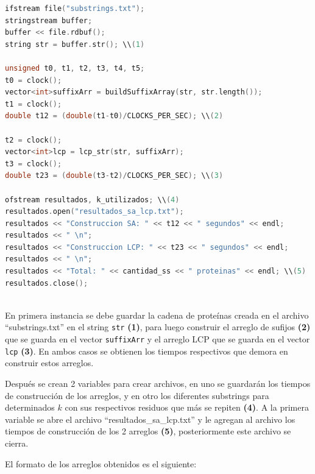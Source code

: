 \begin{lstlisting}[language=C++, caption=Obtención de los arreglos SA y LCP para la cadena de proteínas]
ifstream file("substrings.txt");
stringstream buffer;
buffer << file.rdbuf();
string str = buffer.str(); \\(1)

unsigned t0, t1, t2, t3, t4, t5;
t0 = clock();
vector<int>suffixArr = buildSuffixArray(str, str.length());
t1 = clock();
double t12 = (double(t1-t0)/CLOCKS_PER_SEC); \\(2)

t2 = clock();
vector<int>lcp = lcp_str(str, suffixArr);
t3 = clock();
double t23 = (double(t3-t2)/CLOCKS_PER_SEC); \\(3)

ofstream resultados, k_utilizados; \\(4)
resultados.open("resultados_sa_lcp.txt");
resultados << "Construccion SA: " << t12 << " segundos" << endl;
resultados << " \n";
resultados << "Construccion LCP: " << t23 << " segundos" << endl;
resultados << " \n";
resultados << "Total: " << cantidad_ss << " proteinas" << endl; \\(5)
resultados.close();
	
\end{lstlisting}

En primera instancia se debe guardar la cadena de proteínas creada en el archivo ``substrings.txt'' en el string \texttt{str} \textbf{(1)}, para luego construir el arreglo de sufijos \textbf{(2)} que se guarda en el vector \texttt{suffixArr} y el arreglo LCP que se guarda en el vector \texttt{lcp} \textbf{(3)}. En ambos casos se obtienen los tiempos respectivos que demora en construir estos arreglos.

Después se crean 2 variables para crear archivos, en uno se guardarán los tiempos de construcción de los arreglos, y en otro los diferentes substrings para determinados $k$ con sus respectivos residuos que más se repiten \textbf{(4)}. A la primera variable se abre el archivo ``resultados\_sa\_lcp.txt'' y le agregan al archivo los tiempos de construcción de los 2 arreglos \textbf{(5)}, posteriormente este archivo se cierra.

El formato de los arreglos obtenidos es el siguiente:

